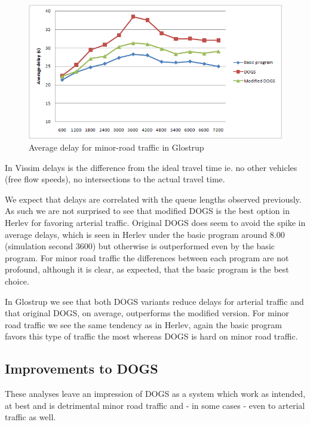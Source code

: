 \begin{figure}[ht]
\begin{minipage}[b]{0.5\linewidth}
    \end{minipage}
    \hspace{0.5cm}
    \begin{minipage}[b]{0.5\linewidth}

\centering
\includegraphics[scale=0.25]{delay_minor-road_glostrup.PNG}
\caption{Average delay for minor-road traffic in Glostrup}
\label{fig:delay_minor-road_glostrup}

    \end{minipage}

\end{figure}

In Vissim delays is the difference from the ideal travel time ie. no other vehicles (free flow speeds), no intersections to the actual travel time. 

We expect that delays are correlated with the queue lengths observed previously. As such we are not surprised to see that modified DOGS is the best option in Herlev for favoring arterial traffic. Original DOGS does seem to avoid the spike in average delays, which is seen in Herlev under the basic program around 8.00 (simulation second 3600) but otherwise is outperformed even by the basic program. 
For minor road traffic the differences between each program are not profound, although it is clear, as expected, that the basic program is the best choice.

In Glostrup we see that both DOGS variants reduce delays for arterial traffic and that original DOGS, on average, outperforms the modified version. For minor road traffic we see the same tendency as in Herlev, again the basic program favors this type of traffic the most whereas DOGS is hard on minor road traffic.

\subsection*{Improvements to DOGS}
These analyses leave an impression of DOGS as a system which work as intended, at best and is detrimental minor road traffic and - in some cases - even to arterial traffic as well.

